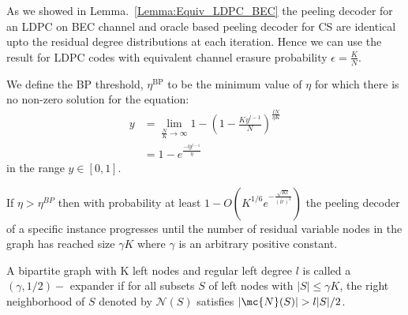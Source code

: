 \documentclass[conference]{IEEEtran}
\begin{document}
\begin{IEEEproof}
As we showed in Lemma.~\ref{Lemma:Equiv_LDPC_BEC} the peeling decoder for an LDPC on BEC channel and oracle based peeling decoder for CS are identical upto the residual degree distributions at each iteration. Hence we can use the result for LDPC codes \cite[Theorem~3.107]{richardson2008modern} with equivalent channel erasure probability $\epsilon=\frac{K}{N}$.
\end{IEEEproof}

\begin{definition}[BP Threshold]
We define the BP threshold, $\eta^{\text{BP}}$ to be the minimum value of $\eta$ for which there is no non-zero solution for the equation:
\begin{align*}
y&=\lim_{\frac{N}{K}\rightarrow\infty}1-\left(1-\frac{Ky^{l-1}}{N}\right)^{\frac{lN}{\eta K}}\\
  &=1-e^{\frac{-ly^{l-1}}{\eta}}
\end{align*}
in the range $y\in [0,1]$.
\end{definition}

\begin{lemma}\cite[Theorem~3.107]{richardson2008modern}
\label{lem:PeelSmallGraph}
If $\eta>\eta^{BP}$ then with probability at least $1-O\left(K^{1/6}e^{-\frac{\sqrt{Kl}}{(lr)^3}}\right)$ the peeling decoder of a specific instance progresses until the number of residual variable nodes in the graph has reached size $\gamma K$ where $\gamma$ is an arbitrary positive constant.
\end{lemma}

\begin{definition}
\label{Def:ExpanderGraph}
A bipartite graph with K left nodes and regular left degree $l$ is called a $(\gamma,1/2)-$ expander if for all subsets $S$ of left nodes with $|S|\leq \gamma K$, the right neighborhood of $S$ denoted by $\mathcal{N}(S)$ satisfies $|\mc{N}(S)|>l|S|/2$.
\end{definition}
\end{document}
